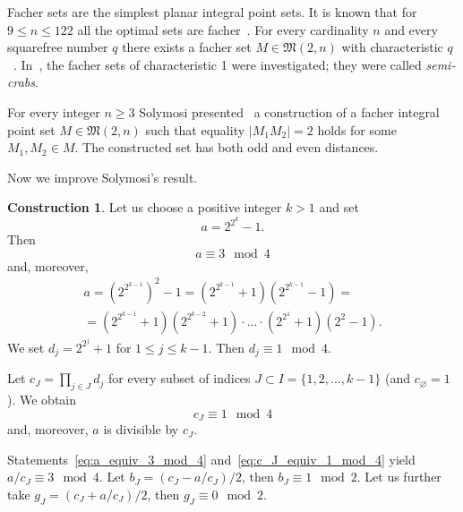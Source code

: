 \documentclass[a4paper,14pt]{article} %
\theoremstyle{plain}
\theoremstyle{definition}
\newtheorem{construction}[theorem]{Construction}
\begin{document}
Facher sets are the simplest planar integral point sets.
It is known that for $9\leq n \leq 122$ all the optimal sets are facher~\cite{kurz2008minimum}.
For every cardinality $n$ and every squarefree number $q$
there exists a facher set $M\in\mathfrak{M}(2,n)$ with characteristic $q$~\cite[Theorem 5]{our-vmmsh-2018}.
In~\cite{antonov2008maximal}, the facher sets of characteristic 1 were investigated; they were called \textit{semi-crabs}.

For every integer $n\geq 3$ Solymosi presented~\cite{solymosi2003note} a construction of a facher integral point set
$M\in\mathfrak{M}(2,n)$
such that equality $|M_1 M_2| = 2$ holds for some $M_1, M_2 \in M$.
The constructed set has both odd and even distances.

Now we improve Solymosi's result.

\begin{construction}
	\label{con:planar_set_with_minimeter_1}
	Let us choose a positive integer $k > 1$ and set
	\begin{equation}
		a = 2^{2^k} - 1
		.
	\end{equation}
	Then
	\begin{equation}
		\label{eq:a_equiv_3_mod_4}
		a \equiv 3 \mod 4
	\end{equation}
	and, moreover,
	\begin{multline}
		a = \left(2^{2^{k-1}}\right)^2 - 1
		=
		\left(2^{2^{k-1}} + 1\right) \left(2^{2^{k-1}} - 1\right)
		=
		\\=
		\left(2^{2^{k-1}} + 1\right) \left(2^{2^{k-2}} + 1\right) \cdot ... \cdot \left(2^{2^1} + 1\right) \left(2^2 - 1\right)
		.
	\end{multline}
	We set $d_j = 2^{2^j} + 1$ for $1 \leq j \leq k-1$.
	Then $d_j \equiv 1 \mod 4$.

	Let $c_J = \prod_{j\in J} d_j$ for every subset of indices $J\subset I = \{1,2,...,k-1\}$
	(and  $c_\varnothing = 1$).
	We obtain
	\begin{equation}
		\label{eq:c_J_equiv_1_mod_4}
		c_J\equiv 1 \mod{4}
	\end{equation}
	and, moreover, $a$ is divisible by $c_J$.


	Statements~\eqref{eq:a_equiv_3_mod_4} and~\eqref{eq:c_J_equiv_1_mod_4} yield $a/c_J \equiv 3 \mod 4$.
	Let $b_J = (c_J - a/c_J)/2$, then $b_J \equiv 1 \mod 2$.
	Let us further take $g_J = (c_J + a/c_J)/2$, then $g_J \equiv 0 \mod 2$.


\end{construction}
\end{document}
